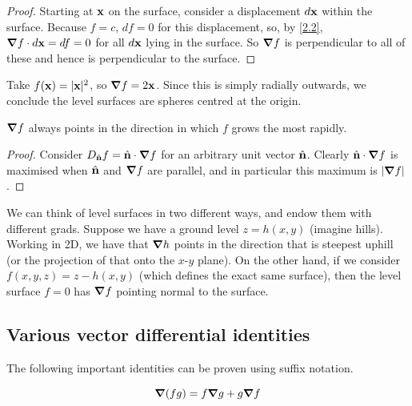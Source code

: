 \documentclass{../template/note}
\begin{document}
    \begin{proof}
        Starting at \(\V x\) on the surface, consider a displacement \(d\V x\) within the surface. Because \(f = c\), \(df = 0\) for this displacement, so, by \cref{2.2}, \(\grad f \cdot d \V x = df = 0\) for all \(d \V x\) lying in the surface. So \(\grad f\) is perpendicular to all of these and hence is perpendicular to the surface.
    \end{proof}
    
    \begin{example*}
        Take \(f(\V x) = |\V x|^2\), so \(\grad f = 2 \V x\). Since this is simply radially outwards, we conclude the level surfaces are spheres centred at the origin.
    \end{example*}
    
    \begin{proposition*}
        \(\grad f\) always points in the direction in which \(f\) grows the most rapidly.
    \end{proposition*}
    
    \begin{proof}
        Consider \(D_{\hvec n}f = \hvec n \cdot \grad f\) for an arbitrary unit vector \(\hvec n\). Clearly \(\hvec n \cdot \grad f\) is maximised when \(\hvec n\) and \(\grad f\) are parallel, and in particular this maximum is \(|\grad f|\).
    \end{proof}
    
    
    \begin{remark*}
        We can think of level surfaces in two different ways, and endow them with different grads. Suppose we have a ground level \(z = h(x, y)\) (imagine hills). Working in 2D, we have that \(\grad h\) points in the direction that is steepest uphill (or the projection of that onto the \(x\)-\(y\) plane). On the other hand, if we consider \(f(x, y, z) = z - h(x, y)\) (which defines the exact same surface), then the level surface \(f = 0\) has \(\grad f\) pointing normal to the surface.
    \end{remark*}
    
    \subsection{Various vector differential identities}

    The following important identities can be proven using suffix notation.

    \begin{proposition}
        \[
            \grad(fg) = f \grad g + g \grad f
        \]
    \end{proposition}
    
\end{document}
